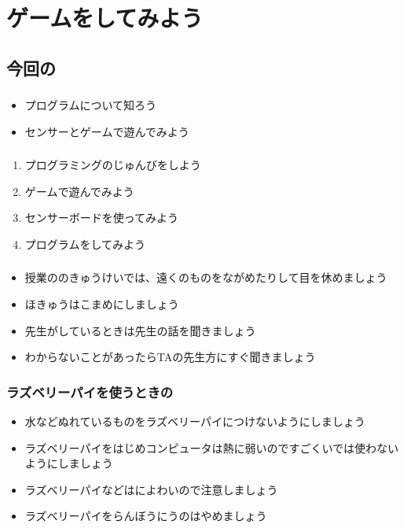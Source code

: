 \documentclass[text02.tex]{subfiles}
\begin{document}
\chapter{ゲームをしてみよう}
\section{今回の}
\subsection{}
\begin{itemize}
  \item プログラムについて知ろう
  \item センサーとゲームで遊んでみよう
\end{itemize}

\subsection{}
\begin{enumerate}
  \item プログラミングのじゅんびをしよう
  \item ゲームで遊んでみよう
  \item センサーボードを使ってみよう
  \item プログラムをしてみよう
\end{enumerate}

\subsection{}
\begin{itemize}
  \item 授業ののきゅうけいでは、遠くのものをながめたりして目を休めましょう
  \item {}ほきゅうはこまめにしましょう
  \item 先生がしているときは先生の話を聞きましょう
  \item わからないことがあったらTAの先生方にすぐ聞きましょう
\end{itemize}

\subsection{ラズベリーパイを使うときの}
\begin{itemize}
  \item 水などぬれているものをラズベリーパイにつけないようにしましょう
  \item ラズベリーパイをはじめコンピュータは熱に弱いのですごくいでは使わないようにしましょう
  \item ラズベリーパイなどはによわいので注意しましょう
  \item ラズベリーパイをらんぼうにうのはやめましょう
\end{itemize}
\clearpage
\end{document}

